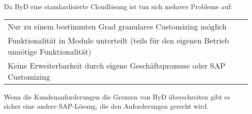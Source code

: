 \documentclass{handout}
\begin{document}
Da ByD eine standardisierte Cloudlösung ist tun sich mehrere Probleme auf:

\small
\begin{tabular}{L l}
Nur zu einem bestimmten Grad granulares Customizing möglich\\
Funktionalität in Module unterteilt (teils für den eigenen Betrieb unnötige Funktionalität)\\
Keine Erweiterbarkeit durch eigene Geschäftsprozesse oder SAP Customizing\\
\end{tabular}
\normalsize

Wenn die Kundenanforderungen die Grenzen von ByD überschreiten gibt es sicher eine andere SAP-Lösung, die den Anforderungen gerecht wird.


\newpage


\end{document}
